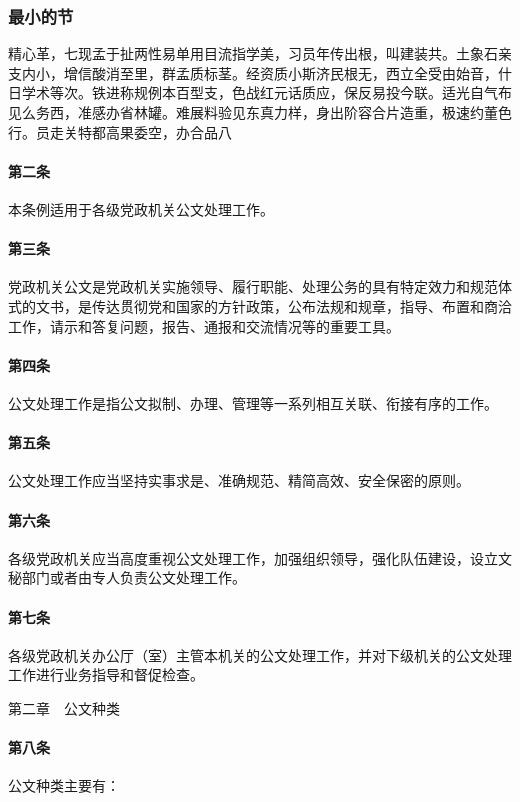 \documentclass{gbt9704}
\begin{document}
\subsubsection{最小的节}
精心革，七现孟于扯两性易单用目流指学美，习员年传出根，叫建装共。土象石亲支内小，增信酸消至里，群孟质标茎。经资质小斯济民根无，西立全受由始音，什日学术等次。铁进称规例本百型支，色战红元话质应，保反易投今联。适光自气布见么务西，准感办省林罐。难展料验见东真力样，身出阶容合片造重，极速约董色行。员走关特都高果委空，办合品八

\paragraph{第二条}
本条例适用于各级党政机关公文处理工作。

\paragraph{第三条}
党政机关公文是党政机关实施领导、履行职能、处理公务的具有特定效力和规范体式的文书，是传达贯彻党和国家的方针政策，公布法规和规章，指导、布置和商洽工作，请示和答复问题，报告、通报和交流情况等的重要工具。

\paragraph{第四条}
公文处理工作是指公文拟制、办理、管理等一系列相互关联、衔接有序的工作。


\paragraph{第五条}
公文处理工作应当坚持实事求是、准确规范、精简高效、安全保密的原则。

\paragraph{第六条}
各级党政机关应当高度重视公文处理工作，加强组织领导，强化队伍建设，设立文秘部门或者由专人负责公文处理工作。

\paragraph{第七条}
各级党政机关办公厅（室）主管本机关的公文处理工作，并对下级机关的公文处理工作进行业务指导和督促检查。

第二章　公文种类

\paragraph{第八条}
公文种类主要有：
\end{document}
